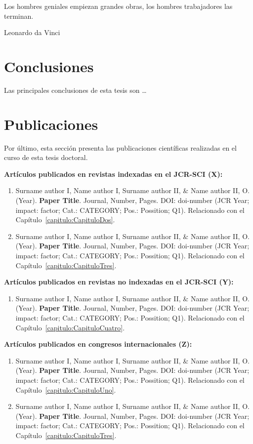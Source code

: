 \epigraph{Los hombres geniales empiezan grandes obras, los hombres trabajadores las terminan.}{Leonardo da Vinci}

\section{Conclusiones}\label{seccion:Conclusiones}

Las principales conclusiones de esta tesis son \dots 

\section{Publicaciones}\label{seccion:Publicaciones}

Por último, esta sección presenta las publicaciones científicas realizadas en el curso de esta tesis doctoral.

\textbf{Artículos publicados en revistas indexadas en el JCR-SCI (X):}

\begin{enumerate}
    \item Surname author I, Name author I, Surname author II, \& Name author II, O. (Year). \textbf{Paper Title}. Journal, Number, Pages. DOI: doi-number (JCR Year; impact: factor; Cat.: CATEGORY; Pos.: Possition; Q1). Relacionado con el Capítulo~\ref{capitulo:CapituloDos}. 
    \item Surname author I, Name author I, Surname author II, \& Name author II, O. (Year). \textbf{Paper Title}. Journal, Number, Pages. DOI: doi-number (JCR Year; impact: factor; Cat.: CATEGORY; Pos.: Possition; Q1). Relacionado con el Capítulo~\ref{capitulo:CapituloTres}. 
\end{enumerate}

\textbf{Artículos publicados en revistas no indexadas en el JCR-SCI (Y):}

\begin{enumerate}
    \item Surname author I, Name author I, Surname author II, \& Name author II, O. (Year). \textbf{Paper Title}. Journal, Number, Pages. DOI: doi-number (JCR Year; impact: factor; Cat.: CATEGORY; Pos.: Possition; Q1). Relacionado con el Capítulo~\ref{capitulo:CapituloCuatro}. 
\end{enumerate}

\textbf{Artículos publicados en congresos internacionales (Z):}

\begin{enumerate}
    \item Surname author I, Name author I, Surname author II, \& Name author II, O. (Year). \textbf{Paper Title}. Journal, Number, Pages. DOI: doi-number (JCR Year; impact: factor; Cat.: CATEGORY; Pos.: Possition; Q1). Relacionado con el Capítulo~\ref{capitulo:CapituloUno}.
   \item Surname author I, Name author I, Surname author II, \& Name author II, O. (Year). \textbf{Paper Title}. Journal, Number, Pages. DOI: doi-number (JCR Year; impact: factor; Cat.: CATEGORY; Pos.: Possition; Q1). Relacionado con el Capítulo~\ref{capitulo:CapituloTres}.
\end{enumerate}

